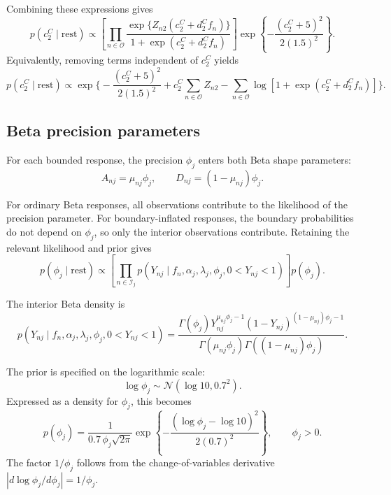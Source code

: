\documentclass[pdftex,12pt,openright,a4paper,oneside]{book}
\begin{document}
Combining these expressions gives
\begin{equation*}
p(c_2^C\mid\mathrm{rest})
\propto
\left[
\prod_{n\in\mathcal{O}}
\frac{
\exp\{Z_{n2}(c_2^C+d_2^Cf_n)\}
}{
1+\exp(c_2^C+d_2^Cf_n)
}
\right]
\exp\!\left\{
-\frac{(c_2^C+5)^2}{2(1.5)^2}
\right\}.
\end{equation*}
Equivalently, removing terms independent of $c_2^C$
yields
\begin{equation*}
p(c_2^C\mid\mathrm{rest})
\propto
\exp\Bigg\{-\frac{(c_2^C+5)^2}{2(1.5)^2}+
c_2^C\sum_{n\in\mathcal{O}}Z_{n2}-
\sum_{n\in\mathcal{O}}
\log\!\left[
1+\exp(c_2^C+d_2^Cf_n)
\right]
\Bigg\}.
\end{equation*}

\subsection{Beta precision parameters}
\label{app:precision_conditionals}

For each bounded response, the precision $\phi_j$
enters both Beta shape parameters:
\begin{equation*}
A_{nj}=\mu_{nj}\phi_j,
\qquad
D_{nj}=(1-\mu_{nj})\phi_j.
\end{equation*}

For ordinary Beta responses, all observations
contribute to the likelihood of the precision parameter.
For boundary-inflated responses, the boundary
probabilities do not depend on $\phi_j$, so only
the interior observations contribute.
Retaining the relevant likelihood and prior gives
\begin{equation*}
p(\phi_j\mid\mathrm{rest})
\propto
\left[
\prod_{n\in\mathcal{I}_j}
p(Y_{nj}\mid f_n,\alpha_j,\lambda_j,\phi_j,
0<Y_{nj}<1)
\right]
p(\phi_j).
\end{equation*}

The interior Beta density is
\begin{equation*}
p(Y_{nj}\mid f_n,\alpha_j,\lambda_j,\phi_j,
0<Y_{nj}<1)=
\frac{
\Gamma(\phi_j)
Y_{nj}^{\mu_{nj}\phi_j-1}
(1-Y_{nj})^{(1-\mu_{nj})\phi_j-1}
}{
\Gamma(\mu_{nj}\phi_j)
\Gamma((1-\mu_{nj})\phi_j)
}.
\end{equation*}

The prior is specified on the logarithmic scale:
\begin{equation*}
\log\phi_j
\sim
\mathcal{N}(\log 10,0.7^2).
\end{equation*}
Expressed as a density for $\phi_j$, this becomes
\begin{equation*}
p(\phi_j)=
\frac{1}{0.7\,\phi_j\sqrt{2\pi}}
\exp\!\left\{
-\frac{(\log\phi_j-\log 10)^2}{2(0.7)^2}
\right\},
\qquad \phi_j>0.
\end{equation*}
The factor $1/\phi_j$ follows from the
change-of-variables derivative
$|d\log\phi_j/d\phi_j|=1/\phi_j$.
\end{document}
